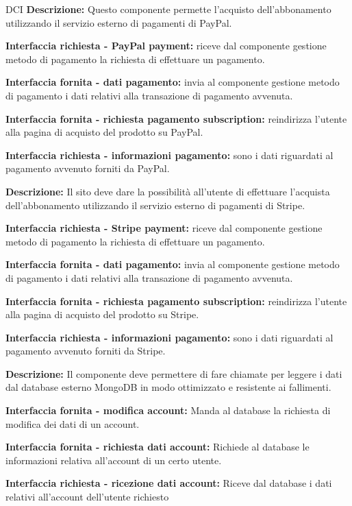 \begin{listaPersonale}{DCI}
    \textbf{Descrizione:} Questo componente permette l'acquisto dell'abbonamento utilizzando il servizio esterno di pagamenti di PayPal.

    \textbf{Interfaccia richiesta - PayPal payment:} riceve dal componente gestione metodo di pagamento la richiesta di effettuare un pagamento.

    \textbf{Interfaccia fornita - dati pagamento:} invia al componente gestione metodo di pagamento i dati relativi alla transazione di pagamento avvenuta.

    \textbf{Interfaccia fornita - richiesta pagamento subscription:} reindirizza l'utente alla pagina di acquisto del prodotto su PayPal.

    \textbf{Interfaccia richiesta - informazioni pagamento:} sono i dati riguardati al pagamento avvenuto forniti da PayPal.



    \textbf{Descrizione:} Il sito deve dare la possibilità all'utente di effettuare l'acquista dell'abbonamento utilizzando il servizio esterno di pagamenti di Stripe.

    \textbf{Interfaccia richiesta - Stripe payment:} riceve dal componente gestione metodo di pagamento la richiesta di effettuare un pagamento.

    \textbf{Interfaccia fornita - dati pagamento:} invia al componente gestione metodo di pagamento i dati relativi alla transazione di pagamento avvenuta.

    \textbf{Interfaccia fornita - richiesta pagamento subscription:} reindirizza l'utente alla pagina di acquisto del prodotto su Stripe.

    \textbf{Interfaccia richiesta - informazioni pagamento:} sono i dati riguardati al pagamento avvenuto forniti da Stripe.



    \textbf{Descrizione:} Il componente deve permettere di fare chiamate per leggere i dati dal database esterno MongoDB in modo ottimizzato e resistente ai fallimenti.

    \textbf{Interfaccia fornita - modifica account:} Manda al database la richiesta di modifica dei dati di un account.

    \textbf{Interfaccia fornita - richiesta dati account:} Richiede al database le informazioni relativa all'account di un certo utente.

    \textbf{Interfaccia richiesta - ricezione dati account:} Riceve dal database i dati relativi all'account dell'utente richiesto


\end{listaPersonale}
